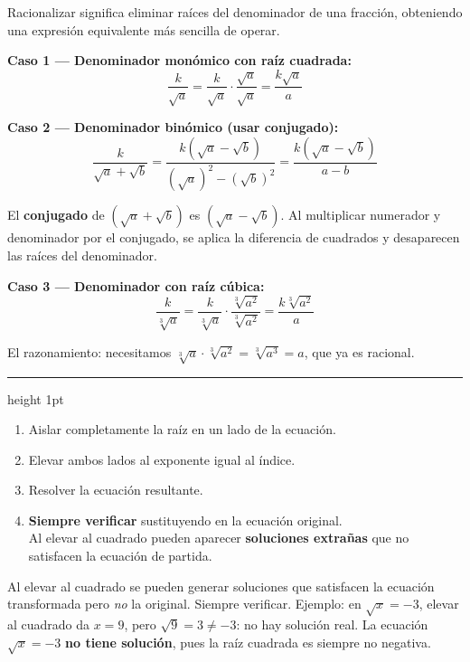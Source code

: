 \documentclass[11pt, letterpaper]{article}
\newcommand{\subbloque}[1]{%
  \vspace{8pt}
  \noindent{\large\bfseries\color{zenitnavy} #1}\par
  \vspace{3pt}
  \hrule height 1pt
  \vspace{6pt}
}
\begin{document}
Racionalizar significa eliminar raíces del denominador de una fracción, obteniendo una expresión equivalente más sencilla de operar.

\begin{tcolorbox}[importantbox, title={Los tres casos de racionalización}]

\textbf{Caso 1 — Denominador monómico con raíz cuadrada:}
$$\frac{k}{\sqrt{a}} = \frac{k}{\sqrt{a}}\cdot\frac{\sqrt{a}}{\sqrt{a}} = \frac{k\sqrt{a}}{a}$$

\textbf{Caso 2 — Denominador binómico (usar conjugado):}
$$\frac{k}{\sqrt{a}+\sqrt{b}} = \frac{k(\sqrt{a}-\sqrt{b})}{(\sqrt{a})^2-(\sqrt{b})^2} = \frac{k(\sqrt{a}-\sqrt{b})}{a-b}$$

El \textbf{conjugado} de $(\sqrt{a}+\sqrt{b})$ es $(\sqrt{a}-\sqrt{b})$. Al multiplicar numerador y denominador por el conjugado, se aplica la diferencia de cuadrados y desaparecen las raíces del denominador.

\textbf{Caso 3 — Denominador con raíz cúbica:}
$$\frac{k}{\sqrt[3]{a}} = \frac{k}{\sqrt[3]{a}}\cdot\frac{\sqrt[3]{a^2}}{\sqrt[3]{a^2}} = \frac{k\sqrt[3]{a^2}}{a}$$

El razonamiento: necesitamos $\sqrt[3]{a}\cdot\sqrt[3]{a^2}=\sqrt[3]{a^3}=a$, que ya es racional.
\end{tcolorbox}

\subbloque{5.4 Ecuaciones con raíces}

\begin{tcolorbox}[importantbox, title={Estrategia general para resolver ecuaciones con raíces}]
\begin{enumerate}
  \item Aislar completamente la raíz en un lado de la ecuación.
  \item Elevar ambos lados al exponente igual al índice.
  \item Resolver la ecuación resultante.
  \item \textbf{Siempre verificar} sustituyendo en la ecuación original. \\ Al elevar al cuadrado pueden aparecer \textbf{soluciones extrañas} que no satisfacen la ecuación de partida.
\end{enumerate}
\end{tcolorbox}

\begin{tcolorbox}[warningbox, title={Error frecuente}]
Al elevar al cuadrado se pueden generar soluciones que satisfacen la ecuación transformada pero \emph{no} la original. Siempre verificar. Ejemplo: en $\sqrt{x}=-3$, elevar al cuadrado da $x=9$, pero $\sqrt{9}=3\neq -3$: no hay solución real. La ecuación $\sqrt{x}=-3$ \textbf{no tiene solución}, pues la raíz cuadrada es siempre no negativa.
\end{tcolorbox}
\end{document}
